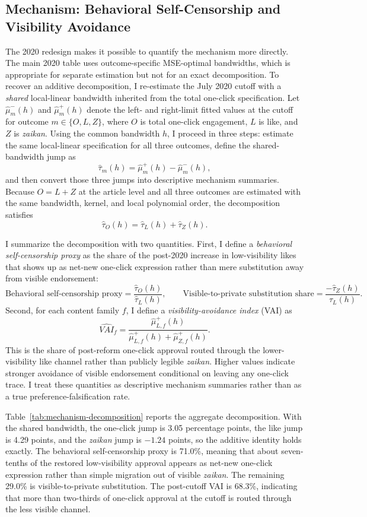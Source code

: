 \documentclass[12pt, american]{article}
\begin{document}
\begin{refsection}
\subsection{Mechanism: Behavioral Self-Censorship and Visibility Avoidance}

The 2020 redesign makes it possible to quantify the mechanism more directly. The main 2020 table uses outcome-specific MSE-optimal bandwidths, which is appropriate for separate estimation but not for an exact decomposition. To recover an additive decomposition, I re-estimate the July 2020 cutoff with a \textit{shared} local-linear bandwidth inherited from the total one-click specification. Let $\hat{\mu}_{m}^{-}(h)$ and $\hat{\mu}_{m}^{+}(h)$ denote the left- and right-limit fitted values at the cutoff for outcome $m \in \{O, L, Z\}$, where $O$ is total one-click engagement, $L$ is like, and $Z$ is \textit{zaikan}. Using the common bandwidth $h$, I proceed in three steps: estimate the same local-linear specification for all three outcomes, define the shared-bandwidth jump as
\[
\hat{\tau}_{m}(h) = \hat{\mu}_{m}^{+}(h) - \hat{\mu}_{m}^{-}(h),
\]
and then convert those three jumps into descriptive mechanism summaries. Because $O = L + Z$ at the article level and all three outcomes are estimated with the same bandwidth, kernel, and local polynomial order, the decomposition satisfies
\[
\hat{\tau}_{O}(h) = \hat{\tau}_{L}(h) + \hat{\tau}_{Z}(h).
\]

I summarize the decomposition with two quantities. First, I define a \textit{behavioral self-censorship proxy} as the share of the post-2020 increase in low-visibility likes that shows up as net-new one-click expression rather than mere substitution away from visible endorsement:
\[
\text{Behavioral self-censorship proxy} = \frac{\hat{\tau}_{O}(h)}{\hat{\tau}_{L}(h)},
\qquad
\text{Visible-to-private substitution share} = \frac{-\hat{\tau}_{Z}(h)}{\hat{\tau}_{L}(h)}.
\]
Second, for each content family $f$, I define a \textit{visibility-avoidance index} (VAI) as
\[
\widehat{VAI}_{f} = \frac{\hat{\mu}_{L,f}^{+}(h)}
{\hat{\mu}_{L,f}^{+}(h) + \hat{\mu}_{Z,f}^{+}(h)}.
\]
This is the share of post-reform one-click approval routed through the lower-visibility like channel rather than publicly legible \textit{zaikan}. Higher values indicate stronger avoidance of visible endorsement conditional on leaving any one-click trace. I treat these quantities as descriptive mechanism summaries rather than as a true preference-falsification rate.

Table~\ref{tab:mechanism-decomposition} reports the aggregate decomposition. With the shared bandwidth, the one-click jump is 3.05 percentage points, the like jump is 4.29 points, and the \textit{zaikan} jump is $-1.24$ points, so the additive identity holds exactly. The behavioral self-censorship proxy is 71.0\%, meaning that about seven-tenths of the restored low-visibility approval appears as net-new one-click expression rather than simple migration out of visible \textit{zaikan}. The remaining 29.0\% is visible-to-private substitution. The post-cutoff VAI is 68.3\%, indicating that more than two-thirds of one-click approval at the cutoff is routed through the less visible channel.


\end{refsection}
\end{document}
